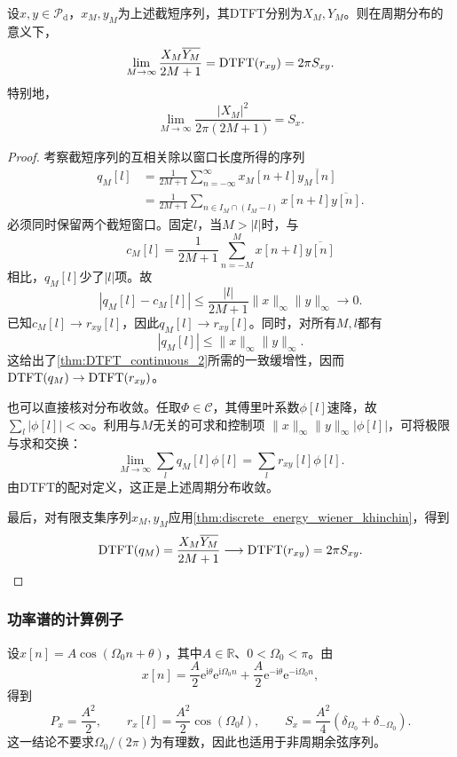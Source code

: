 \begin{theorem}\label{thm:deiscrete_winner_khinchin}
    设$x,y\in\mathcal{P}_{\mathrm d}$，$x_M,y_M$为上述截短序列，其DTFT分别为$X_M,Y_M$。则在周期分布的意义下，
    $$
        \lim_{M\to\infty}\frac{X_M\overline{Y_M}}{2M+1}
        =\operatorname{DTFT}(r_{xy})=2\pi S_{xy}.
    $$
    特别地，
    $$
        \lim_{M\to\infty}\frac{|X_M|^2}{2\pi(2M+1)}=S_x.
    $$
\end{theorem}
\begin{proof}
    考察截短序列的互相关除以窗口长度所得的序列
    \begin{align*}
        q_M[l]
         & =\frac1{2M+1}\sum_{n=-\infty}^{\infty}
        x_M[n+l]\overline{y_M[n]}                  \\
         & =\frac1{2M+1}\sum_{n\in I_M\cap(I_M-l)}
        x[n+l]\overline{y[n]}.
    \end{align*}
    必须同时保留两个截短窗口。固定$l$，当$M>|l|$时，与
    $$
        c_M[l]=\frac1{2M+1}\sum_{n=-M}^{M}
        x[n+l]\overline{y[n]}
    $$
    相比，$q_M[l]$少了$|l|$项。故
    $$
        |q_M[l]-c_M[l]|
        \le\frac{|l|}{2M+1}\|x\|_\infty\|y\|_\infty
        \longrightarrow0.
    $$
    已知$c_M[l]\to r_{xy}[l]$，因此$q_M[l]\to r_{xy}[l]$。同时，对所有$M,l$都有
    $$
        |q_M[l]|\le\|x\|_\infty\|y\|_\infty.
    $$
    这给出了\cref{thm:DTFT_continuous_2}所需的一致缓增性，因而
    $\operatorname{DTFT}(q_M)\to\operatorname{DTFT}(r_{xy})$。

    也可以直接核对分布收敛。任取$\Phi\in\mathcal{C}$，其傅里叶系数$\phi[l]$速降，故$\sum_l|\phi[l]|<\infty$。利用与$M$无关的可求和控制项
    $\|x\|_\infty\|y\|_\infty|\phi[l]|$，可将极限与求和交换：
    $$
        \lim_{M\to\infty}\sum_l q_M[l]\phi[l]
        =\sum_l r_{xy}[l]\phi[l].
    $$
    由DTFT的配对定义，这正是上述周期分布收敛。

    最后，对有限支集序列$x_M,y_M$应用\cref{thm:discrete_energy_wiener_khinchin}，得到
    $$
        \operatorname{DTFT}(q_M)=\frac{X_M\overline{Y_M}}{2M+1}
        \longrightarrow\operatorname{DTFT}(r_{xy})=2\pi S_{xy}.
    $$
\end{proof}

\subsubsection{功率谱的计算例子}

\begin{example}[余弦序列的功率谱]
    设$x[n]=A\cos(\Omega_0n+\theta)$，其中$A\in\mathbb{R}$、$0<\Omega_0<\pi$。由
    $$
        x[n]=\frac{A}{2}\mathrm{e}^{\mathrm{i}\theta}\mathrm{e}^{\mathrm{i}\Omega_0n}
        +\frac{A}{2}\mathrm{e}^{-\mathrm{i}\theta}\mathrm{e}^{-\mathrm{i}\Omega_0n},
    $$
    得到
    $$
        P_x=\frac{A^2}{2},\qquad
        r_x[l]=\frac{A^2}{2}\cos(\Omega_0l),
        \qquad
        S_x=\frac{A^2}{4}(\delta_{\Omega_0}+\delta_{-\Omega_0}).
    $$
    这一结论不要求$\Omega_0/(2\pi)$为有理数，因此也适用于非周期余弦序列。
\end{example}

